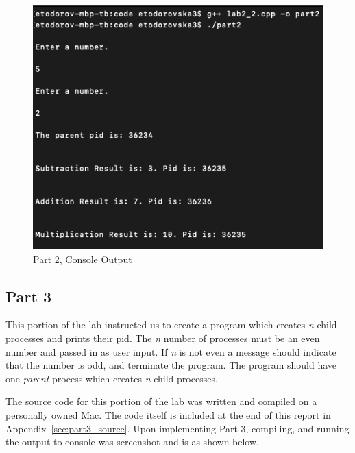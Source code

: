         \begin{figure}[H]
            \centering
            \includegraphics[width=\linewidth]{figures/Part2Output.png}
            \caption{Part 2, Console Output}
            \label{fig:part2_output}
        \end{figure}



    \newpage
    \subsection{Part 3}\label{subsec:part3}
        This portion of the lab instructed us to create a program which creates \emph{n} child processes and prints their pid.
        The \emph{n} number of processes must be an even number and passed in as user input.
        If \emph{n} is not even a message should indicate that the number is odd, and terminate the program.
        The program should have one \emph{parent} process which creates \emph{n} child processes.

        \medskip
        \noindent The source code for this portion of the lab was written and compiled on a personally owned Mac.
        The code itself is included at the end of this report in Appendix~\ref{sec:part3_source}.
        Upon implementing Part 3, compiling, and running the output to console was screenshot and is as shown below.


